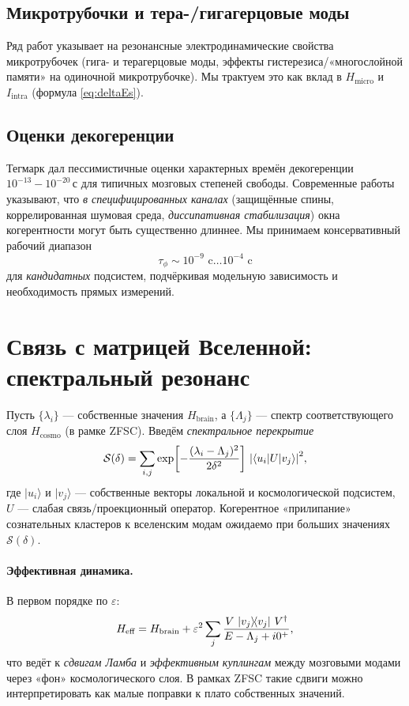 \documentclass[12pt,a4paper]{article}
\begin{document}
\subsection{Микротрубочки и тера-/гигагерцовые моды}
Ряд работ указывает на резонансные электродинамические свойства микротрубочек (гига- и терагерцовые моды, эффекты гистерезиса/«многослойной памяти» на одиночной микротрубочке). Мы трактуем это как вклад в $H_{\text{micro}}$ и $I_{\text{intra}}$ (формула \ref{eq:deltaEs}). 

\subsection{Оценки декогеренции}
Тегмарк дал пессимистичные оценки характерных времён декогеренции $10^{-13}\!-\!10^{-20}$\,с для типичных мозговых степеней свободы. Современные работы указывают, что \emph{в специфицированных каналах} (защищённые спины, коррелированная шумовая среда, \emph{диссипативная стабилизация}) окна когерентности могут быть существенно длиннее. Мы принимаем консервативный рабочий диапазон
\[
\tau_\phi \sim 10^{-9}\text{ c} \dots 10^{-4}\text{ c}
\]
для \emph{кандидатных} подсистем, подчёркивая модельную зависимость и необходимость прямых измерений.

\section{Связь с матрицей Вселенной: спектральный резонанс}
Пусть $\{\lambda_i\}$ — собственные значения $H_{\text{brain}}$, а $\{\Lambda_j\}$ — спектр соответствующего слоя $H_{\text{cosmo}}$ (в рамке ZFSC). Введём \emph{спектральное перекрытие}
\begin{equation}
\mathcal{S}(\delta) = \sum_{i,j} \exp\!\left[-\frac{(\lambda_i-\Lambda_j)^2}{2\delta^2}\right] \,\abs{\langle u_i | U | v_j\rangle}^2,
\end{equation}
где $|u_i\rangle$ и $|v_j\rangle$ — собственные векторы локальной и космологической подсистем, $U$ — слабая связь/проекционный оператор. Когерентное «прилипание» сознательных кластеров к вселенским модам ожидаемо при больших значениях $\mathcal{S}(\delta)$.

\paragraph{Эффективная динамика.}
В первом порядке по $\varepsilon$:
\begin{equation}
H_{\text{eff}} = H_{\text{brain}} + \varepsilon^2 \sum_{j} \frac{V \, \outerproduct{v_j}{v_j} \, V^\dagger}{E-\Lambda_j+i0^+},
\end{equation}
что ведёт к \emph{сдвигам Ламба} и \emph{эффективным куплингам} между мозговыми модами через «фон» космологического слоя. В рамках ZFSC такие сдвиги можно интерпретировать как малые поправки к плато собственных значений.
\end{document}
